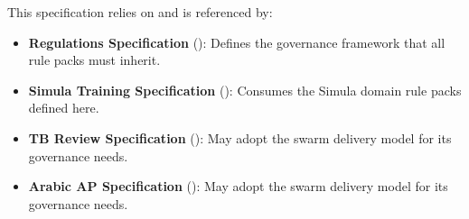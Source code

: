 This specification relies on and is referenced by:
\begin{itemize}
  \item \textbf{Regulations Specification} (): Defines the governance framework that all rule packs must inherit.
  \item \textbf{Simula Training Specification} (): Consumes the Simula domain rule packs defined here.
  \item \textbf{TB Review Specification} (): May adopt the swarm delivery model for its governance needs.
  \item \textbf{Arabic AP Specification} (): May adopt the swarm delivery model for its governance needs.
\end{itemize}
